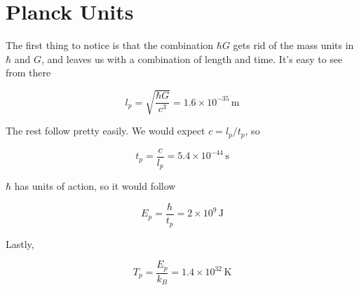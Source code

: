 \documentclass[12pt]{article}
\begin{document}
\section{Planck Units}

The first thing to notice is that the combination \(\hbar G\) gets rid of the mass units in \(\hbar\) and \(G\), and leaves us with a combination of length and time. It's easy to see from there 

\[ l_p = \sqrt{\frac{\hbar G}{c^3}} = 1.6 \times 10^{-35} \,\mathrm{m}
\]

The rest follow pretty easily. We would expect \(c = l_p/t_p\), so 

\[ t_p = \frac{c}{l_p} = 5.4 \times 10^{-44} \, \mathrm{s}
\]

\(\hbar\) has units of action, so it would follow

\[ E_p = \frac{\hbar}{t_p} = 2 \times 10^9 \,\mathrm{J}
\]

Lastly, 

\[ T_p = \frac{E_p}{k_B} = 1.4 \times 10^{32}\,\mathrm{K}
\]
\end{document}
